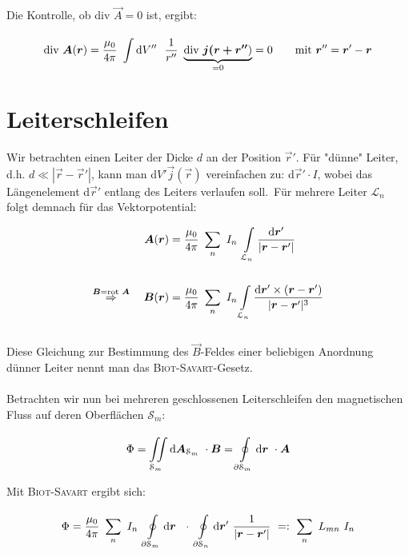 Die Kontrolle, ob div $\vec{A} =0$ ist, ergibt:

\begin{equation*}
\div\vec{A}(\vec{r}) = \frac{\mu_0}{4\pi} \ \Int{}{}{V''}\ \frac{1}{r''} \ \underbrace{\div\vec{j(\vec{r}+\vec{r}''})}_{=0}=0 \qquad \text{mit } \vec{r}'' = \vec{r}'-\vec{r}
\end{equation*}

\section{Leiterschleifen}

Wir betrachten einen Leiter der Dicke $d$ an der Position $\vec{r}'$. Für "dünne" Leiter, d.h. $d \ll |\vec{r}-\vec{r}'|$, kann man d$V' \vec{j}(\vec{r})$ vereinfachen zu: d$\vec{r}' \cdot I$, wobei das Längenelement d$\vec{r}'$ entlang des Leiters verlaufen soll.\
Für mehrere Leiter $\mathcal{L}_n$ folgt demnach für das Vektorpotential:

\begin{align*}
\vec{A}(\vec{r}) &= \frac{\mu_0}{4\pi}\ \sum_n \ I_n \ \int\limits_{\mathcal{L}_n} \frac{\mathrm{d}\vec{r}'}{|\vec{r}-\vec{r}'|}\\
\ \\
\overset{\vec{B}= \rot\vec{A}}{\Rightarrow} \quad \vec{B}(\vec{r}) &= \frac{\mu_0}{4\pi} \ \sum_n \ I_n \int\limits_{\mathcal{L}_n} \frac{\mathrm{d}\vec{r}' \times (\vec{r}-\vec{r}')}{|\vec{r}-\vec{r}'|^3}
\end{align*}
\ \\
Diese Gleichung zur Bestimmung des $\vec{B}$-Feldes einer beliebigen Anordnung dünner Leiter nennt man das \textsc{Biot-Savart}-Gesetz.\
\\
\ \\
Betrachten wir nun bei mehreren geschlossenen Leiterschleifen den magnetischen Fluss auf deren Oberflächen $\mathcal{S}_m$:

\begin{equation*}
\Phi = \iint\limits_{{\mathcal{S}_m}}^{{}}\mathrm{d}{\bm{A}_{\mathcal{S}_m}}\ \cdot\bm{B} = \oint\limits_{{\partial\mathcal{S}_m}}^{{}}\mathrm{d}{\bm{r}}\ \cdot\bm{A}
\end{equation*}

Mit \textsc{Biot-Savart} ergibt sich:

\begin{equation*}
\Phi = \frac{\mu_0}{4\pi}\ \sum_n \ I_n \ \Oint{\partial\mathcal{S}_m}{}{\vec{r}}\ \cdot \ \Oint{\partial\mathcal{S}_n}{}{\vec{r}'}\frac{1}{|\vec{r}-\vec{r}'|} \ =: \ \sum_n \ L_{mn} \ I_n
\end{equation*}

